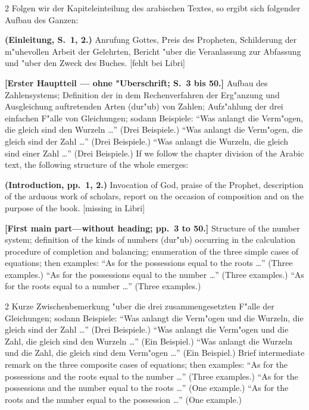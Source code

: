 \documentclass[10pt,a4paper]{article}
\renewcommand{\switchcolumn}{\syncronize\nointerlineskip\columnbreak}
\newcommand{\enquote}[1]{``#1''}
\begin{document}
\begin{paracol}{2}
Folgen wir der Kapiteleinteilung des arabischen Textes, so ergibt sich folgender Aufbau des Ganzen:

\textbf{(Einleitung, S.\ 1, 2.)} Anrufung Gottes, Preis des Propheten, Schilderung der m"uhevollen Arbeit der Gelehrten, Bericht "uber die Veranlassung zur Abfassung und "uber den Zweck des Buches. [fehlt bei Libri]

\textbf{[Erster Hauptteil --- ohne "Uberschrift; S.\ 3 bis 50.]} Aufbau des Zahlensystems; Definition der in dem Rechenverfahren der Erg"anzung und Ausgleichung auftretenden Arten (dur"ub) von Zahlen; Aufz"ahlung der drei einfachen F"alle von Gleichungen; sodann Beispiele: \enquote{Was anlangt die Verm"ogen, die gleich sind den Wurzeln \ldots{}} (Drei Beispiele.) \enquote{Was anlangt die Verm"ogen, die gleich sind der Zahl \ldots{}} (Drei Beispiele.) \enquote{Was anlangt die Wurzeln, die gleich sind einer Zahl \ldots{}} (Drei Beispiele.)
\switchcolumn
If we follow the chapter division of the Arabic text, the following structure of the whole emerges:

\textbf{(Introduction, pp.\ 1, 2.)} Invocation of God, praise of the Prophet, description of the arduous work of scholars, report on the occasion of composition and on the purpose of the book. [missing in Libri]

\textbf{[First main part---without heading; pp.\ 3 to 50.]} Structure of the number system; definition of the kinds of numbers (dur"ub) occurring in the calculation procedure of completion and balancing; enumeration of the three simple cases of equations; then examples: ``As for the possessions equal to the roots \ldots{}'' (Three examples.) ``As for the possessions equal to the number \ldots{}'' (Three examples.) ``As for the roots equal to a number \ldots{}'' (Three examples.)
\end{paracol}

\begin{paracol}{2}
Kurze Zwischenbemerkung "uber die drei zusammengesetzten F"alle der Gleichungen; sodann Beispiele: \enquote{Was anlangt die Verm"ogen und die Wurzeln, die gleich sind der Zahl \ldots{}} (Drei Beispiele.) \enquote{Was anlangt die Verm"ogen und die Zahl, die gleich sind den Wurzeln \ldots{}} (Ein Beispiel.) \enquote{Was anlangt die Wurzeln und die Zahl, die gleich sind dem Verm"ogen \ldots{}} (Ein Beispiel.)
\switchcolumn
Brief intermediate remark on the three composite cases of equations; then examples: ``As for the possessions and the roots equal to the number \ldots{}'' (Three examples.) ``As for the possessions and the number equal to the roots \ldots{}'' (One example.) ``As for the roots and the number equal to the possession \ldots{}'' (One example.)
\end{paracol}
\end{document}
